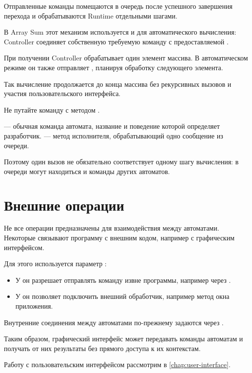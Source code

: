 Отправленные команды помещаются в очередь после
успешного завершения перехода и обрабатываются
Runtime отдельными шагами.

В Array Sum этот механизм используется и для
автоматического вычисления: Controller соединяет
собственную требуемую команду 
с предоставляемой .

При получении  Controller обрабатывает один
элемент массива. В автоматическом режиме он также
отправляет , планируя обработку
следующего элемента.

Так вычисление продолжается до конца массива без
рекурсивных вызовов и участия пользовательского интерфейса.

\begin{notebox}
Не путайте команду  с методом
.

 --- обычная команда автомата, название
и поведение которой определяет разработчик.
 --- метод исполнителя,
обрабатывающий одно сообщение из очереди.

Поэтому один вызов  не обязательно
соответствует одному шагу вычисления: в очереди могут
находиться и команды других автоматов.
\end{notebox}

\section{Внешние операции}

Не все операции предназначены для взаимодействия
между автоматами. Некоторые связывают программу
с внешним кодом, например с графическим интерфейсом.

Для этого используется параметр :

\begin{itemize}
  \item У  он разрешает
    отправлять команду извне программы, например
    через .
  \item У  он позволяет
    подключить внешний обработчик, например
    метод окна приложения.
\end{itemize}

Внутренние соединения между автоматами по-прежнему
задаются через .

Таким образом, графический интерфейс может передавать
команды автоматам и получать от них результаты
без прямого доступа к их контекстам.

Работу с пользовательским интерфейсом рассмотрим
в \cref{chap:user-interface}.
